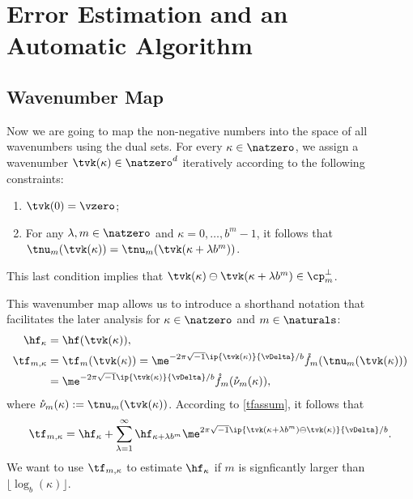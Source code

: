 \documentclass[]{elsarticle}
\theoremstyle{definition}
\renewcommand{\bbK}{\natzero^d}
\newcommand{\rf}{\mathring{f}}
\newcommand{\rnu}{\mathring{\nu}}
\begin{document}
\section{Error Estimation and an Automatic Algorithm}

\subsection{Wavenumber Map}

Now we are going to map the non-negative numbers into the space of all wavenumbers using the dual sets.  For every $\kappa \in \natzero$, we assign a wavenumber $\tvk(\kappa) \in \bbK$ iteratively according to the following constraints:
\begin{enumerate}
\renewcommand{\labelenumi}{\roman{enumi})}

\item $\tvk(0)= \vzero$;

\item For any $\lambda, m \in \natzero$ and $\kappa=0, \ldots, b^m-1$, it follows that  $\tnu_m(\tvk(\kappa))=\tnu_m(\tvk(\kappa+\lambda b^m))$.

\end{enumerate}
This last condition implies that $\tvk(\kappa) \ominus \tvk(\kappa+\lambda b^m) \in \cp_m^{\perp}$.

This wavenumber map allows us to introduce a shorthand notation that facilitates the later analysis for $\kappa \in \natzero$ and $m \in \naturals$:
\begin{align*}
\hf_{\kappa} & =\hf(\tvk(\kappa)), \\
\tf_{m,\kappa}& = \tf_m(\tvk(\kappa))= \me^{-2 \pi \sqrt{-1} \ip{\tvk(\kappa)}{\vDelta}/b} \rf_m(\tnu_m(\tvk(\kappa)))\\
&= \me^{-2 \pi \sqrt{-1} \ip{\tvk(\kappa)}{\vDelta}/b} \rf_m(\rnu_m(\kappa)),
\end{align*}
where $\rnu_m(\kappa):=\tnu_m(\tvk(\kappa))$. According to \eqref{tfassum}, it follows that
\begin{equation}
\tf_{m,\kappa} = \hf_{\kappa} + \sum_{\lambda=1}^{\infty} \hf_{\kappa+\lambda b^{m}} \me^{2 \pi \sqrt{-1} \ip{\tvk(\kappa+\lambda b^{m}) \ominus \tvk(\kappa)}{\vDelta}/b}.
\label{tfassumc}
\end{equation}
We want to use $\tf_{m,\kappa}$ to estimate $\hf_{\kappa}$ if $m$ is signficantly larger than $\lfloor \log_b(\kappa) \rfloor$.
\end{document}
